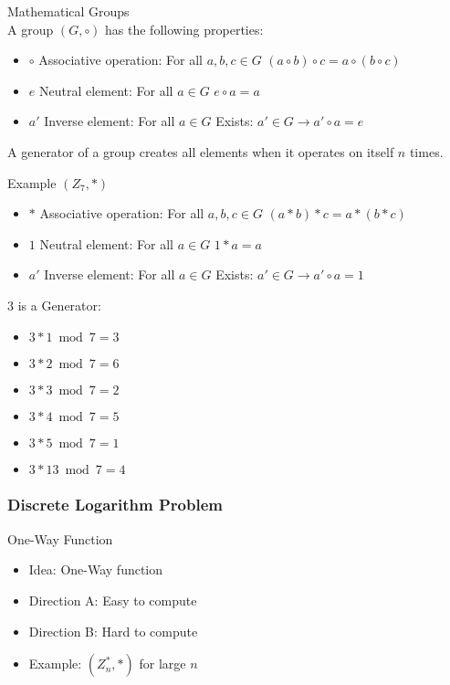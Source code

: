 \begin{definition}{Mathematical Groups}\\
    A group $(G, \circ)$ has the following properties:
    \begin{itemize}
        \item $\circ$ Associative operation: For all $a, b, c \in G$ $(a \circ b) \circ c = a \circ (b \circ c)$
        \item $e$ Neutral element: For all $a \in G$ $e \circ a = a$
        \item $a'$ Inverse element: For all $a \in G$ Exists: $a' \in G \rightarrow a' \circ a = e$
    \end{itemize}
    
    A generator of a group creates all elements when it operates on itself $n$ times.
\end{definition}

\begin{example2}{Example} $(Z_7,*)$
    \begin{itemize}
        \item $*$ Associative operation: For all $a, b, c \in G$ $(a * b) * c = a * (b * c)$
        \item $1$ Neutral element: For all $a \in G$ $1 * a = a$
        \item $a'$ Inverse element: For all $a \in G$ Exists: $a' \in G \rightarrow a' \circ a = 1$
    \end{itemize}
    
    3 is a Generator:
    \begin{itemize}
        \item $3 * 1 \bmod 7 = 3$
        \item $3 * 2 \bmod 7 = 6$
        \item $3 * 3 \bmod 7 = 2$
        \item $3 * 4 \bmod 7 = 5$
        \item $3 * 5 \bmod 7 = 1$
        \item $3 * 13 \bmod 7 = 4$
    \end{itemize}
\end{example2}

\subsubsection{Discrete Logarithm Problem}

\begin{concept}{One-Way Function}
    \begin{itemize}
        \item Idea: One-Way function
        \item Direction A: Easy to compute
        \item Direction B: Hard to compute
        \item Example: $(Z_n^*, *)$ for large $n$
    \end{itemize}
\end{concept}

